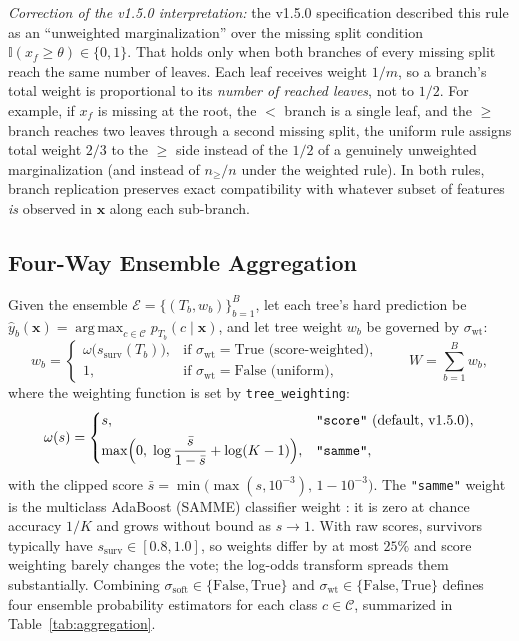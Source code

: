 \documentclass[11pt,a4paper]{article}
\newcommand{\code}[1]{\texttt{#1}}
\newcommand{\Ind}{\mathbb{I}}
\DeclareMathOperator*{\argmax}{arg\,max}
\begin{document}
\noindent\emph{Correction of the v1.5.0 interpretation:} the v1.5.0 specification described this rule as an ``unweighted marginalization'' over the missing split condition $\Ind(x_f \ge \theta) \in \{0, 1\}$. That holds only when both branches of every missing split reach the same number of leaves. Each leaf receives weight $1/m$, so a branch's total weight is proportional to its \emph{number of reached leaves}, not to $1/2$. For example, if $x_f$ is missing at the root, the $<$ branch is a single leaf, and the $\ge$ branch reaches two leaves through a second missing split, the uniform rule assigns total weight $2/3$ to the $\ge$ side instead of the $1/2$ of a genuinely unweighted marginalization (and instead of $n_{\ge}/n$ under the weighted rule). In both rules, branch replication preserves exact compatibility with whatever subset of features \emph{is} observed in $\mathbf{x}$ along each sub-branch.

\subsection{Four-Way Ensemble Aggregation}
\label{sec:aggregation}

Given the ensemble $\mathcal{E} = \{(T_b, w_b)\}_{b=1}^{B}$, let each tree's hard prediction be $\hat{y}_b(\mathbf{x}) = \argmax_{c \in \mathcal{C}} p_{T_b}(c \mid \mathbf{x})$, and let tree weight $w_b$ be governed by $\sigma_{\text{wt}}$:
\begin{equation}
  w_b =
  \begin{cases}
    \omega\big(s_{\text{surv}}(T_b)\big), & \text{if } \sigma_{\text{wt}} = \text{True (score-weighted)}, \\
    1, & \text{if } \sigma_{\text{wt}} = \text{False (uniform)},
  \end{cases}
  \qquad
  W = \sum_{b=1}^{B} w_b,
\end{equation}
where the weighting function is set by \code{tree\_weighting}:
\begin{equation}
  \omega(s) =
  \begin{cases}
    s, & \text{\code{"score"} (default, v1.5.0)}, \\[4pt]
    \max\!\Big(0,\; \log\dfrac{\bar{s}}{1 - \bar{s}} + \log(K - 1)\Big), & \text{\code{"samme"}},
  \end{cases}
\end{equation}
with the clipped score $\bar{s} = \min\!\big(\max(s, 10^{-3}),\, 1 - 10^{-3}\big)$. The \code{"samme"} weight is the multiclass AdaBoost (SAMME) classifier weight \citep{zhu2009}: it is zero at chance accuracy $1/K$ and grows without bound as $s \to 1$. With raw scores, survivors typically have $s_{\text{surv}} \in [0.8, 1.0]$, so weights differ by at most $25\%$ and score weighting barely changes the vote; the log-odds transform spreads them substantially.
Combining $\sigma_{\text{soft}} \in \{\text{False}, \text{True}\}$ and $\sigma_{\text{wt}} \in \{\text{False}, \text{True}\}$ defines four ensemble probability estimators for each class $c \in \mathcal{C}$, summarized in Table~\ref{tab:aggregation}.
\end{document}
